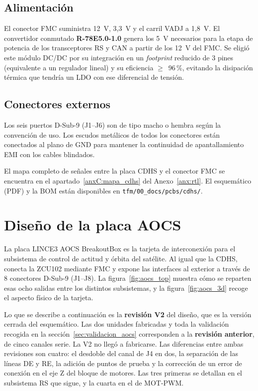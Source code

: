 \subsection{Alimentación}

El conector FMC suministra 12~V, 3,3~V y el carril VADJ a 1,8~V. El convertidor conmutado
\textbf{R-78E5.0-1.0} genera los 5~V necesarios para la etapa de potencia de los transceptores
RS y CAN a partir de los 12~V del FMC. Se eligió este módulo DC/DC por su integración en
un \textit{footprint} reducido de 3 pines (equivalente a un regulador lineal) y su eficiencia
$\geq$~96\,\%, evitando la disipación térmica que tendría un LDO con ese diferencial de tensión.

\subsection{Conectores externos}

Los seis puertos D-Sub-9 (J1--J6) son de tipo macho o hembra según la convención de uso.
Los escudos metálicos de todos los conectores están conectados al plano de GND para
mantener la continuidad de apantallamiento EMI con los cables blindados.

El mapa completo de señales entre la placa CDHS y el conector FMC se encuentra en el
apartado~\ref{anxC:mapa_cdhs} del Anexo~\ref{anx:rtl}. El esquemático (PDF) y la BOM están disponibles en
\texttt{tfm/00\_docs/pcbs/cdhs/}.

\section{Diseño de la placa AOCS} \label{sec:diseno_aocs}

La placa LINCE3 AOCS BreakoutBox es la tarjeta de interconexión para el subsistema de
control de actitud y órbita del satélite. Al igual que la CDHS, conecta la ZCU102 mediante
FMC y expone las interfaces al exterior a través de 8 conectores D-Sub-9 (J1--J8). La
figura~\ref{fig:aocs_top} muestra cómo se reparten esas ocho salidas entre los distintos
subsistemas, y la figura~\ref{fig:aocs_3d} recoge el aspecto físico de la tarjeta.

Lo que se describe a continuación es la \textbf{revisión V2} del diseño, que es la versión
cerrada del esquemático. Las dos unidades fabricadas y toda la validación
recogida en la sección~\ref{sec:validacion_aocs} corresponden a la \textbf{revisión anterior},
de cinco canales serie. La V2 no llegó a fabricarse. Las diferencias entre ambas
revisiones son cuatro: el desdoble del canal de J4 en dos, la separación de las líneas DE y RE,
la adición de puntos de prueba y la corrección de un error de conexión en el eje Z del bloque
de motores. Las tres primeras se detallan en el subsistema RS que sigue, y la cuarta en el de
MOT-PWM.

